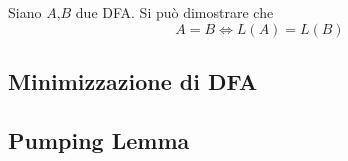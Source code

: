 \documentclass{subfiles}
\begin{document}
Siano \(A \text{,} B\) due DFA. Si può dimostrare che
\[
    A = B \iff L(A) = L(B)
\]

\subsection{Minimizzazione di DFA}


\subsection{Pumping Lemma}

\end{document}
